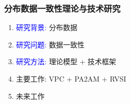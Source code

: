 \documentclass[shownotes]{beamer}
\title[\papertitle]{\papertitle}
\subtitle{}
\author[魏恒峰]{魏恒峰 \\导师: 吕建 \hspace{0.20cm} 黄宇}
\institute{南京大学软件所}
\date{2016年7月25日}
\theoremstyle{plain}
\begin{document}
\renewcommand\figurename{图} 
\renewcommand\tablename{表} 

\maketitle

\begin{frame}
  \frametitle{分布数据一致性理论与技术研究}
  \begin{enumerate}
    \setlength{\itemsep}{15pt}
	\item \textcolor{blue}{研究背景:} {\footnotesize 分布数据}
	\item \textcolor{blue}{研究问题:} {\footnotesize 数据一致性}
	\item \textcolor{blue}{研究方法:} {\footnotesize 理论模型 + 技术框架}
    \item 主要工作: {\footnotesize VPC + PA2AM + RVSI}
    \item 未来工作
  \end{enumerate}
\end{frame}






\end{document}
